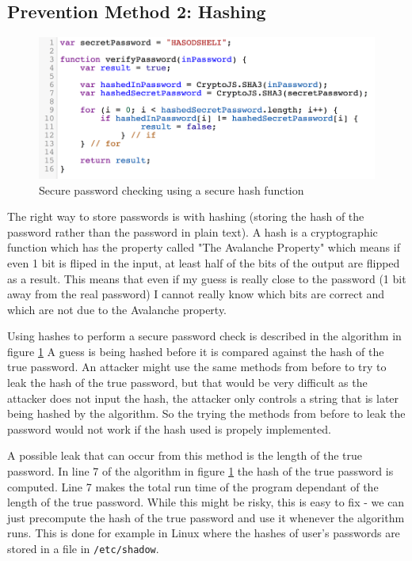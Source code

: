 \subsection{Prevention Method 2: Hashing}
\begin{figure}[H]
    
    \includegraphics[scale=0.6]{images/chapter_1/password_check_algo_3.png}
    \caption{Secure password checking using a secure hash function}
    \label{c1_fig_pass_check_3}
\end{figure}

The right way to store passwords is with hashing (storing the hash of the password
rather than the password in plain text). A hash is a cryptographic function which has the property called "The Avalanche Property" which means
if even 1 bit is fliped in the input, at least half of the bits of the output are flipped as a result.
This means that even if my guess is really close to the password (1 bit away from the real password) I cannot really know which bits are correct and which are not due to the Avalanche property.

Using hashes to perform a secure password check is described in the algorithm in figure \ref{c1_fig_pass_check_3}
A guess is being hashed before it is compared against the hash of the true password.
An attacker might use the same methods from before to try to leak the hash of the true password, 
 but that would be very difficult as the attacker does not input the hash, the attacker only controls a string that is later being hashed by the algorithm.
 So the trying the methods from before to leak the password would not work if the hash used is propely implemented. 

A possible leak that can occur from this method is the length of the true password.
In line 7 of the algorithm in figure \ref{c1_fig_pass_check_3} the hash of the true password is computed.
Line 7 makes the total run time of the program dependant of the length of the true password.
While this might be risky, this is easy to fix - we can just precompute the hash of the true password
and use it whenever the algorithm runs. This is done for example in Linux where the hashes 
of user's passwords are stored in a file in \lstinline{/etc/shadow}.



